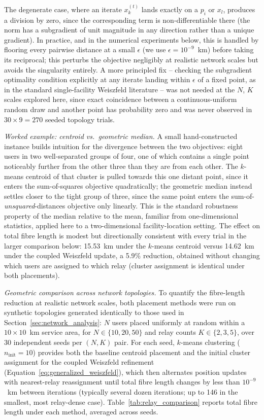 \documentclass[12pt]{article}
\begin{document}
The degenerate case, where an iterate $x_k^{(t)}$ lands exactly on a $p_i$ or $x_l$, produces a division by zero, since the corresponding term is non-differentiable there (the norm has a subgradient of unit magnitude in any direction rather than a unique gradient). In practice, and in the numerical experiments below, this is handled by flooring every pairwise distance at a small $\epsilon$ (we use $\epsilon = 10^{-9}$~km) before taking its reciprocal; this perturbs the objective negligibly at realistic network scales but avoids the singularity entirely. A more principled fix -- checking the subgradient optimality condition explicitly at any iterate landing within $\epsilon$ of a fixed point, as in the standard single-facility Weiszfeld literature -- was not needed at the $N$, $K$ scales explored here, since exact coincidence between a continuous-uniform random draw and another point has probability zero and was never observed in $30 \times 9 = 270$ seeded topology trials.

\textit{Worked example: centroid vs.\ geometric median.} A small hand-constructed instance builds intuition for the divergence between the two objectives: eight users in two well-separated groups of four, one of which contains a single point noticeably further from the other three than they are from each other. The $k$-means centroid of that cluster is pulled towards this one distant point, since it enters the sum-of-squares objective quadratically; the geometric median instead settles closer to the tight group of three, since the same point enters the sum-of-\emph{unsquared}-distances objective only linearly. This is the standard robustness property of the median relative to the mean, familiar from one-dimensional statistics, applied here to a two-dimensional facility-location setting. The effect on total fibre length is modest but directionally consistent with every trial in the larger comparison below: 15.53~km under the $k$-means centroid versus 14.62~km under the coupled Weiszfeld update, a 5.9\% reduction, obtained without changing which users are assigned to which relay (cluster assignment is identical under both placements).

\textit{Geometric comparison across network topologies.} To quantify the fibre-length reduction at realistic network scales, both placement methods were run on synthetic topologies generated identically to those used in Section~\ref{sec:network_analysis}: $N$ users placed uniformly at random within a $10\times10$~km service area, for $N \in \{10, 20, 50\}$ and relay counts $K \in \{2, 3, 5\}$, over 30 independent seeds per $(N,K)$ pair. For each seed, $k$-means clustering ($n_\text{init}=10$) provides both the baseline centroid placement and the initial cluster assignment for the coupled Weiszfeld refinement (Equation~\ref{eq:generalized_weiszfeld}), which then alternates position updates with nearest-relay reassignment until total fibre length changes by less than $10^{-9}$~km between iterations (typically several dozen iterations; up to 146 in the smallest, most relay-dense case). Table~\ref{tab:relay_comparison} reports total fibre length under each method, averaged across seeds.
\end{document}

